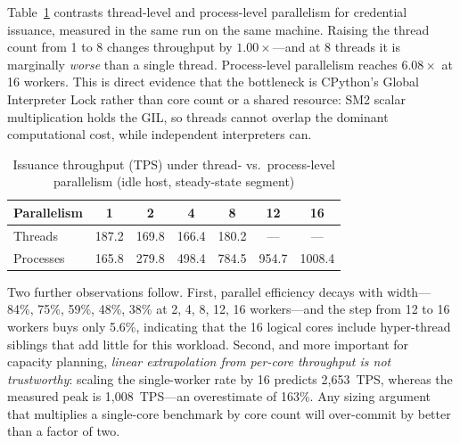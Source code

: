 \documentclass[10pt,twocolumn]{IEEEtran}
\begin{document}
Table~\ref{tab:parallel} contrasts thread-level and process-level
parallelism for credential issuance, measured in the same run on the same
machine. Raising the thread count from 1 to 8 changes throughput by
$1.00\times$---and at 8 threads it is marginally \emph{worse} than a
single thread. Process-level parallelism reaches $6.08\times$ at 16
workers. This is direct evidence that the bottleneck is CPython's Global
Interpreter Lock rather than core count or a shared resource: SM2 scalar
multiplication holds the GIL, so threads cannot overlap the dominant
computational cost, while independent interpreters can.

\begin{table}[t]
  \caption{Issuance throughput (TPS) under thread- vs.\ process-level
    parallelism (idle host, steady-state segment)}
  \label{tab:parallel}
  \centering\small\setlength{\tabcolsep}{3pt}
  \begin{tabular}{lcccccc}
    \toprule
    \textbf{Parallelism} & \textbf{1} & \textbf{2} & \textbf{4} &
    \textbf{8} & \textbf{12} & \textbf{16} \\
    \midrule
    Threads   & 187.2 & 169.8 & 166.4 & 180.2 & --- & --- \\
    Processes & 165.8 & 279.8 & 498.4 & 784.5 & 954.7 & 1008.4 \\
    \bottomrule
  \end{tabular}
\end{table}

Two further observations follow. First, parallel efficiency decays with
width---84\%, 75\%, 59\%, 48\%, 38\% at 2, 4, 8, 12, 16 workers---and the
step from 12 to 16 workers buys only 5.6\%, indicating that the 16
logical cores include hyper-thread siblings that add little for this
workload. Second, and more important for capacity planning, \emph{linear
extrapolation from per-core throughput is not trustworthy}: scaling the
single-worker rate by 16 predicts 2,653~TPS, whereas the measured peak is
1,008~TPS---an overestimate of 163\%. Any sizing argument that multiplies
a single-core benchmark by core count will over-commit by better than a
factor of two.
\end{document}
